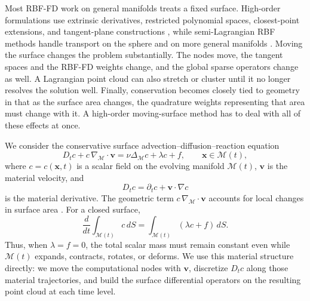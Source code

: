 \documentclass[a4paper,fleqn]{cas-sc}
\begin{document}
Most RBF-FD work on general manifolds treats a fixed surface. High-order formulations use extrinsic derivatives, restricted polynomial spaces, closest-point extensions, and tangent-plane constructions
\cite{piret2012orthogonal,shankar2015rbffdSurfaces,lehto2017rbfcompact,shankar_rbf-loi_2018,petras_rbf-fd_2018,PetrasLingPiretRuuth2019LSRBFCPM,ShankarWrightNarayan2020,reeger_sphere,reeger_smooth,reeger_closed,wright2023mgm,JonesBoslerKuberryWright2023}, while semi-Lagrangian RBF methods handle transport on the sphere and on more general manifolds
\cite{shankar_mesh-free_2018,petras_meshfree_2022}.
Moving the surface changes the problem substantially. The nodes move, the tangent spaces and the RBF-FD weights change, and the global sparse operators change as well. A Lagrangian point cloud can also stretch or cluster until it no longer resolves the solution well. Finally, conservation becomes closely tied to geometry in that as the surface area changes, the quadrature weights representing that area must change with it. A high-order moving-surface method has to deal with all of these effects at once.

We consider the conservative surface advection--diffusion--reaction equation
\begin{equation}
  D_t c + c\,\nabla_{\mathcal M}\!\cdot \bm v
  =
  \nu \Delta_{\mathcal M} c + \lambda c + f,
  \qquad \bm x\in\mathcal M(t),
  \label{eq:moving-surface-pde}
\end{equation}
where $c=c(\bm x,t)$ is a scalar field on the evolving manifold $\mathcal M(t)$, $\bm v$ is the material velocity, and
\[
D_t c = \partial_t c+\bm v\cdot\nabla c
\]
is the material derivative. The geometric term $c\,\nabla_{\mathcal M}\!\cdot\bm v$ accounts for local changes in surface area
\cite{DziukElliott2007EvolvingSurfaces,DziukElliott2013,ChenLing2020KernelHeatTransport}.
For a closed surface,
\[
  \frac{d}{dt}\int_{\mathcal M(t)} c\,dS
  =
  \int_{\mathcal M(t)} (\lambda c+f)\,dS.
\]
Thus, when $\lambda=f=0$, the total scalar mass must remain constant even while $\mathcal M(t)$ expands, contracts, rotates, or deforms. We use this material structure directly: we move the computational nodes with $\bm v$, discretize $D_t c$ along those material trajectories, and build the surface differential operators on the resulting point cloud at each time level.
\end{document}

